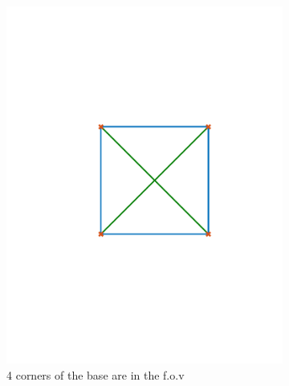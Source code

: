 \begin{figure}[!htbp]
  \centering
   \begin{subfigure}[b]{0.3\textwidth}
        \includegraphics[width=\textwidth]{img/platform_4_edges.pdf} 
        \caption{4 corners of the base are in the f.o.v} 
                \label{fig:4_corners}
   \end{subfigure}\hspace{5em}
   \begin{subfigure}[b]{0.3\textwidth}

\end{subfigure}
\end{figure}
